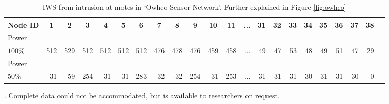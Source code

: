 \documentclass[conference,final]{IEEEtran}
\newcommand*{\bd}[1]{\multicolumn{1}{|c}{\bfseries #1}}
\begin{document}
\begin{table}[t!]
\centering
\begin{tabular}{|l|*{20}{r|}r}
\hline
\bd{Node ID}           & \bd{1} & \bd{2} & \bd{3} & \bd{4} & \bd{5} & \bd{6} & \bd{7} & \bd{8} & \bd{9} & \bd{10} & \bd{11} & \bd{...} & \bd{31} & \bd{32} & \bd{33} & \bd{34} & \bd{35} & \bd{36} & \bd{37} & \bd{38} \\
\hline		\hline

Power	  &  &  &  &  &  &  &  &  &  &  &  &  &  &  &   &  &  &  &  &  \\
$100\% $          & 512 & 529 & 512 & 512 & 512  & 512 & 476 & 478 & 476 & 459 & 458 & ...& 49 & 47 & 53  & 48 & 49 & 51 & 47 & 29 \\
\hline

Power	  &  &  &  &  &  &  &  &  &  &  &  &  &  &  &   &  &  &  &  &  \\
$50\%$            &31 & 59&254& 31& 31 &283& 32& 32& 254& 31 &253 & ...& 31 & 31 & 31  & 30 & 31 & 31 & 30 & 0 \\
\hline
\end{tabular}
\caption{IWS from intrusion at motes in `Owheo Sensor Network'. Further explained in Figure-\ref{fig:owheo}}. Complete data could not be accommodated, but is available to researchers on request.
\label{tab:owheo}
\end{table}
\end{document}
